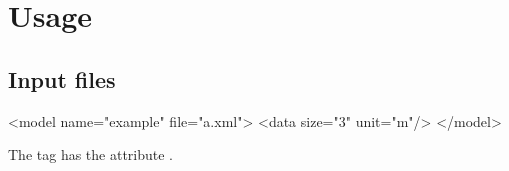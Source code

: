 \chapter{Usage}\label{ch:usage}
\section{Input files}\label{sec:input}
\begin{GenericCode}[language=XML]
<model name="example" file="a.xml">
  <data size="3" unit="m"/>
</model>
\end{GenericCode}
The tag  has the attribute .
